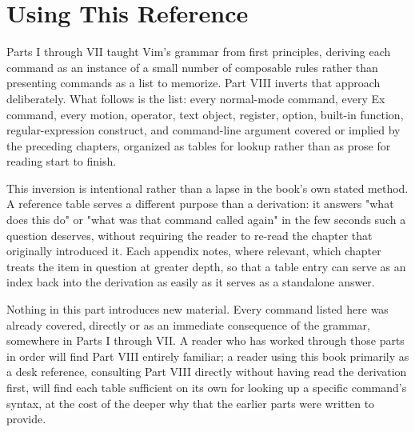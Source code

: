 \chapter*{Using This Reference}

Parts I through VII taught Vim's grammar from first principles, deriving each command as an instance of a small number of composable rules rather than presenting commands as a list to memorize. Part VIII inverts that approach deliberately. What follows is the list: every normal-mode command, every Ex command, every motion, operator, text object, register, option, built-in function, regular-expression construct, and command-line argument covered or implied by the preceding chapters, organized as tables for lookup rather than as prose for reading start to finish.

This inversion is intentional rather than a lapse in the book's own stated method. A reference table serves a different purpose than a derivation: it answers "what does this do" or "what was that command called again" in the few seconds such a question deserves, without requiring the reader to re-read the chapter that originally introduced it. Each appendix notes, where relevant, which chapter treats the item in question at greater depth, so that a table entry can serve as an index back into the derivation as easily as it serves as a standalone answer.

Nothing in this part introduces new material. Every command listed here was already covered, directly or as an immediate consequence of the grammar, somewhere in Parts I through VII. A reader who has worked through those parts in order will find Part VIII entirely familiar; a reader using this book primarily as a desk reference, consulting Part VIII directly without having read the derivation first, will find each table sufficient on its own for looking up a specific command's syntax, at the cost of the deeper why that the earlier parts were written to provide.
